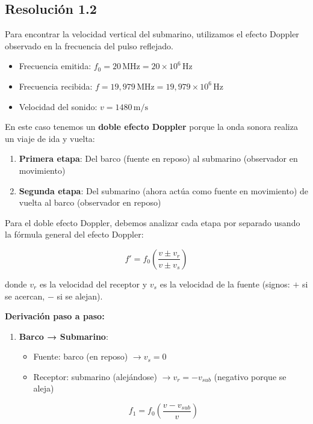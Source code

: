 \documentclass[
  11pt,
  letterpaper,
   addpoints,
   answers
  ]{exam}
\begin{document}
\begin{questions}
\begin{solution}
\subsection*{Resolución 1.2 }

Para encontrar la velocidad vertical del submarino, utilizamos el efecto Doppler observado en la frecuencia del pulso reflejado.

\begin{itemize}
    \item Frecuencia emitida: $f_0 = 20\,\mathrm{MHz} = 20 \times 10^6\,\mathrm{Hz}$
    \item Frecuencia recibida: $f = 19{,}979\,\mathrm{MHz} = 19{,}979 \times 10^6\,\mathrm{Hz}$
    \item Velocidad del sonido: $v = 1480\,\mathrm{m/s}$
\end{itemize}


En este caso tenemos un \textbf{doble efecto Doppler} porque la onda sonora realiza un viaje de ida y vuelta:
\begin{enumerate}
    \item \textbf{Primera etapa}: Del barco (fuente en reposo) al submarino (observador en movimiento)
    \item \textbf{Segunda etapa}: Del submarino (ahora actúa como fuente en movimiento) de vuelta al barco (observador en reposo)
\end{enumerate}

Para el doble efecto Doppler, debemos analizar cada etapa por separado usando la fórmula general del efecto Doppler:

\begin{equation}
f' = f_0 \left(\frac{v \pm v_r}{v \pm v_s}\right)
\end{equation}

donde $v_r$ es la velocidad del receptor y $v_s$ es la velocidad de la fuente (signos: $+$ si se acercan, $-$ si se alejan).

\textbf{Derivación paso a paso:}

\begin{enumerate}
    \item \textbf{Barco → Submarino}: 
    \begin{itemize}
        \item Fuente: barco (en reposo) $\rightarrow v_s = 0$
        \item Receptor: submarino (alejándose) $\rightarrow v_r = -v_{sub}$ (negativo porque se aleja)
    \end{itemize}
    \[f_1 = f_0 \left(\frac{v - v_{sub}}{v}\right)\]
    

\end{enumerate}
\end{solution}
\end{questions}
\end{document}
